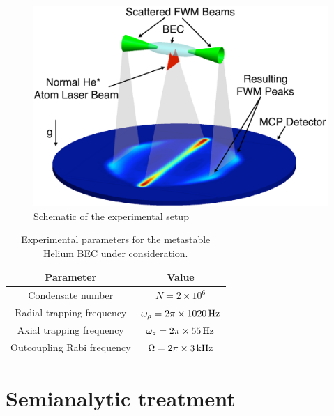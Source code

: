 \begin{figure}[htbp]
    \centering
        \includegraphics[height=3in]{Schematic}
    \caption{Schematic of the experimental setup}
    \label{Peaks:Schematic}
\end{figure}


\begin{table}
    \centering
    \begin{tabular}{cc}
    \toprule
    Parameter & Value\\
    \midrule
    Condensate number & $N = 2\times 10^6$\\
    Radial trapping frequency & $\omega_\rho = 2 \pi \times \unit[1020]{Hz}$\\
    Axial trapping frequency & $\omega_z = 2\pi \times \unit[55]{Hz}$\\
    Outcoupling Rabi frequency & $\Omega = 2\pi \times \unit[3]{kHz}$\\
    \bottomrule
    \end{tabular}
    \caption{Experimental parameters for the metastable Helium BEC under consideration.}
    \label{Peaks:ExperimentalParameters}
\end{table}

\section{Semianalytic treatment}


